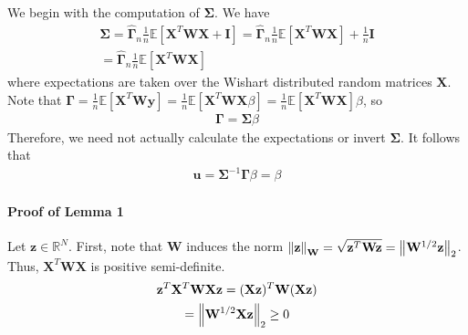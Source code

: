 \documentclass[mnsc,blindrev]{informs3}
\begin{document}
                We begin with the computation of $\mathbf{\Sigma}$. We have
                \begin{gather*}
                    \mathbf{\Sigma} = \hat{\mathbf{\Gamma}}_n \frac{1}{n}\mathds{E}[\mathbf{X}^T \mathbf{W} \mathbf{X} + \mathbf{I}] 
                    = \hat{\mathbf{\Gamma}}_n \frac{1}{n}\mathds{E}[\mathbf{X}^T \mathbf{W} \mathbf{X}] + \frac{1}{n} \mathbf{I} \\
                    = \hat{\mathbf{\Gamma}}_n \frac{1}{n}\mathds{E}[\mathbf{X}^T \mathbf{W} \mathbf{X}]
                \end{gather*}
                where expectations are taken over the Wishart distributed random matrices $\mathbf{X}$.
                Note that $\mathbf{\Gamma} = \frac{1}{n}\mathds{E}[\mathbf{X}^T \mathbf{W} \mathbf{y}]=\frac{1}{n}\mathds{E}[\mathbf{X}^T \mathbf{W} \mathbf{X} \beta]=\frac{1}{n}\mathds{E}[\mathbf{X}^T \mathbf{W} \mathbf{X}] \beta$, so 
                \begin{gather*}
                    \mathbf{\Gamma} = \mathbf{\Sigma} \beta  
                \end{gather*}
        Therefore, we need not actually calculate the expectations or invert $\mathbf{\Sigma}$. It follows that
        \begin{gather*}
            \mathbf{u} = \mathbf{\Sigma}^{-1} \mathbf{\Gamma} \beta = \beta
        \end{gather*}
     
    
        \paragraph{Proof of Lemma 1}
            Let $\mathbf{z} \in \mathbb{R}^N$. First, note that $\mathbf{W}$ induces the norm $\norm{\mathbf{z}}_\mathbf{W} = \sqrt{\mathbf{z}^T \mathbf{W} \mathbf{z}} = \norm{\mathbf{W}^{1/2}\mathbf{z}}_2$. Thus, $\mathbf{X}^T \mathbf{W} \mathbf{X}$ is positive semi-definite. 
            \begin{gather*}
                \mathbf{z}^T \mathbf{X}^T \mathbf{W} \mathbf{X} \mathbf{z} = (\mathbf{X} \mathbf{z})^T \mathbf{W} (\mathbf{X} \mathbf{z}) \\
                = \norm{\mathbf{W}^{1/2} \mathbf{X}\mathbf{z}}_2 \geq 0
            \end{gather*}
            
\end{document}
